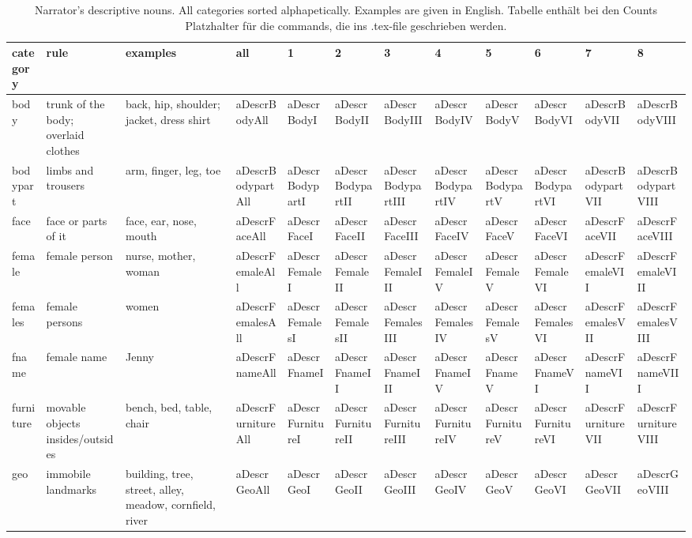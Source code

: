 \documentclass[english]{article}
\begin{document}
\begin{table}[t]
    \caption{Narrator's descriptive nouns. All categories sorted alphapetically. Examples are given in English. Tabelle enthält bei den Counts Platzhalter für die commands, die ins .tex-file geschrieben werden.}
\label{tab:descr-nouns}
\begin{tabular}{llllllllllll}
\toprule
\textbf{category} & \textbf{rule} & \textbf{examples} & \textbf{all} & \textbf{1} & \textbf{2} & \textbf{3} & \textbf{4} & \textbf{5} & \textbf{6} & \textbf{7} & \textbf{8} \\
\midrule
body & trunk of the body; overlaid clothes & back, hip, shoulder; jacket, dress shirt & aDescrBodyAll & aDescrBodyI & aDescrBodyII & aDescrBodyIII & aDescrBodyIV & aDescrBodyV & aDescrBodyVI & aDescrBodyVII & aDescrBodyVIII \tabularnewline
bodypart & limbs and trousers & arm, finger, leg, toe & aDescrBodypartAll & aDescrBodypartI & aDescrBodypartII & aDescrBodypartIII & aDescrBodypartIV & aDescrBodypartV & aDescrBodypartVI & aDescrBodypartVII & aDescrBodypartVIII \tabularnewline
face & face or parts of it & face, ear, nose, mouth & aDescrFaceAll & aDescrFaceI & aDescrFaceII & aDescrFaceIII & aDescrFaceIV & aDescrFaceV & aDescrFaceVI & aDescrFaceVII & aDescrFaceVIII \tabularnewline
female & female person & nurse, mother, woman & aDescrFemaleAll & aDescrFemaleI & aDescrFemaleII & aDescrFemaleIII & aDescrFemaleIV & aDescrFemaleV & aDescrFemaleVI & aDescrFemaleVII & aDescrFemaleVIII \tabularnewline
females & female persons & women & aDescrFemalesAll & aDescrFemalesI & aDescrFemalesII & aDescrFemalesIII & aDescrFemalesIV & aDescrFemalesV & aDescrFemalesVI & aDescrFemalesVII & aDescrFemalesVIII \tabularnewline
fname & female name & Jenny & aDescrFnameAll & aDescrFnameI & aDescrFnameII & aDescrFnameIII & aDescrFnameIV & aDescrFnameV & aDescrFnameVI & aDescrFnameVII & aDescrFnameVIII \tabularnewline
furniture & movable objects insides/outsides & bench, bed, table, chair & aDescrFurnitureAll & aDescrFurnitureI & aDescrFurnitureII & aDescrFurnitureIII & aDescrFurnitureIV & aDescrFurnitureV & aDescrFurnitureVI & aDescrFurnitureVII & aDescrFurnitureVIII \tabularnewline
geo & immobile landmarks & building, tree, street, alley, meadow, cornfield, river & aDescrGeoAll & aDescrGeoI & aDescrGeoII & aDescrGeoIII & aDescrGeoIV & aDescrGeoV & aDescrGeoVI & aDescrGeoVII & aDescrGeoVIII \tabularnewline

\end{tabular}
\end{table}
\end{document}
